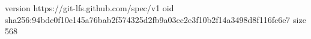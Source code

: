 version https://git-lfs.github.com/spec/v1
oid sha256:94bdc0f10e145a76bab2f574325d2fb9a03cc2e3f10b2f14a3498d8f116fc6e7
size 568
